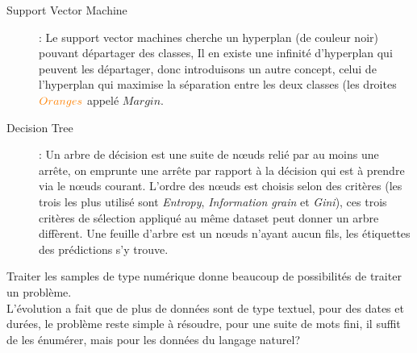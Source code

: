 \begin{description}
\item[Support Vector Machine]: Le support vector machines cherche un hyperplan (de couleur noir) pouvant départager des classes,
Il en existe une infinité d'hyperplan qui peuvent les départager, donc introduisons un autre concept, celui de 
l'hyperplan qui maximise la séparation entre les deux classes (les droites $\textcolor{orange}{Oranges}$ appelé $Margin$.\\

\item[Decision Tree]: Un arbre de décision est une suite de nœuds relié par au moins une arrête, on emprunte une arrête par rapport à la décision qui est à prendre via le nœuds courant. L'ordre des nœuds est choisis selon des critères (les trois les plus utilisé sont \textit{Entropy}, \textit{Information grain} et \textit{Gini}), ces trois critères de sélection appliqué au même dataset peut donner un arbre diffèrent. Une feuille d'arbre est un nœuds n'ayant aucun fils, les étiquettes des prédictions s'y trouve.
\cshape{0.5}{
\begin{tikzpicture}[sibling distance=8em,
  every node/.style = {scale=1,
    draw=none, align=center}]]
  \node {$C < 2.77$}
 	  child { node {$B < 1.72$ }
 	    child { node {$Class B$}}
 	    child { node {$A < 3.67$}
 	      child { node {$Class A$}
 	      }
 	      child { node {$Class C$} }
 	    }
 	  }
 	  child { node {$Class A$} }
    ;
\end{tikzpicture}
}
\end{description}

\pagebreak
Traiter les samples de type numérique donne beaucoup de possibilités de traiter un problème.\\
L'évolution a fait que de plus de données sont de type textuel, pour des dates et durées, le problème reste simple à résoudre, pour une suite de mots fini, il suffit de les énumérer, mais pour les données du langage naturel?\\
\linebreak


